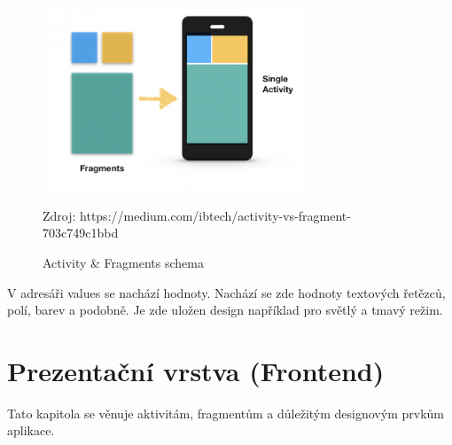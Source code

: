 \newpage
\begin{figure}[h]
    \centering
    \includegraphics[width=0.7\textwidth]{images/activityfragment.png} %
    \caption{Activity \& Fragments schema}
    \label{fig:sunset} %
    \vspace{0.5em} %
    {\footnotesize Zdroj: https://medium.com/ibtech/activity-vs-fragment-703c749c1bbd \par} %
\end{figure}

V adresáři values se nachází hodnoty. Nachází se zde hodnoty textových řetězců, polí, barev a podobně. Je zde uložen design například pro světlý a tmavý režim.

\newpage

\section{Prezentační vrstva (Frontend)}
\hspace{14pt} Tato kapitola se věnuje aktivitám, fragmentům a důležitým designovým prvkům aplikace. 

